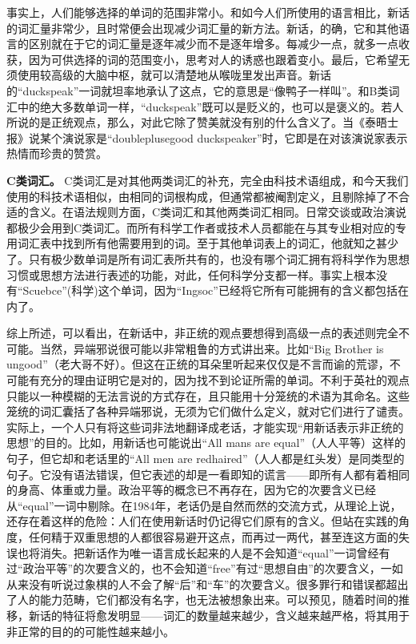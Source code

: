 事实上，人们能够选择的单词的范围非常小。和如今人们所使用的语言相比，新话的词汇量非常少，且时常便会出现减少词汇量的新方法。新话，的确，它和其他语言的区别就在于它的词汇量是逐年减少而不是逐年增多。每减少一点，就多一点收获，因为可供选择的词的范围变小，思考对人的诱惑也跟着变小。最后，它希望无须使用较高级的大脑中枢，就可以清楚地从喉咙里发出声音。新话的``duckspeak''一词就坦率地承认了这点，它的意思是``像鸭子一样叫''。和B类词汇中的绝大多数单词一样，``duckspeak''既可以是贬义的，也可以是褒义的。若人所说的是正统观点，那么，对此它除了赞美就没有别的什么含义了。当《泰晤士报》说某个演说家是``doubleplusegood
duckspeaker''时，它即是在对该演说家表示热情而珍贵的赞赏。

\sectionbreak

\textbf{C类词汇。} C类词汇是对其他两类词汇的补充，完全由科技术语组成，和今天我们使用的科技术语相似，由相同的词根构成，但通常都被阉割定义，且剔除掉了不合适的含义。在语法规则方面，C类词汇和其他两类词汇相同。日常交谈或政治演说都极少会用到C类词汇。而所有科学工作者或技术人员都能在与其专业相对应的专用词汇表中找到所有他需要用到的词。至于其他单词表上的词汇，他就知之甚少了。只有极少数单词是所有词汇表所共有的，也没有哪个词汇拥有将科学作为思想习惯或思想方法进行表述的功能，对此，任何科学分支都一样。事实上根本没有``Scuebce''(科学)这个单词，因为``Ingsoc''已经将它所有可能拥有的含义都包括在内了。

\sectionbreak

综上所述，可以看出，在新话中，非正统的观点要想得到高级一点的表述则完全不可能。当然，异端邪说很可能以非常粗鲁的方式讲出来。比如``Big
Brother is
ungood''（老大哥不好）。但这在正统的耳朵里听起来仅仅是不言而谕的荒谬，不可能有充分的理由证明它是对的，因为找不到论证所需的单词。不利于英社的观点只能以一种模糊的无法言说的方式存在，且只能用十分笼统的术语为其命名。这些笼统的词汇囊括了各种异端邪说，无须为它们做什么定义，就对它们进行了谴责。实际上，一个人只有将这些词非法地翻译成老话，才能实现``用新话表示非正统的思想''的目的。比如，用新话也可能说出``All
mans are equal''（人人平等）这样的句子，但它却和老话里的``All men are
redhaired''（人人都是红头发）是同类型的句子。它没有语法错误，但它表述的却是一看即知的谎言——即所有人都有着相同的身高、体重或力量。政治平等的概念已不再存在，因为它的次要含义已经从``equal''一词中剔除。在1984年，老话仍是自然而然的交流方式，从理论上说，还存在着这样的危险：人们在使用新话时仍记得它们原有的含义。但站在实践的角度，任何精于双重思想的人都很容易避开这点，而再过一两代，甚至连这方面的失误也将消失。把新话作为唯一语言成长起来的人是不会知道``equal''一词曾经有过``政治平等''的次要含义的，也不会知道``free''有过``思想自由''的次要含义，一如从来没有听说过象棋的人不会了解``后''和``车''的次要含义。很多罪行和错误都超出了人的能力范畴，它们都没有名字，也无法被想象出来。可以预见，随着时间的推移，新话的特征将愈发明显——词汇的数量越来越少，含义越来越严格，将其用于非正常的目的的可能性越来越小。


